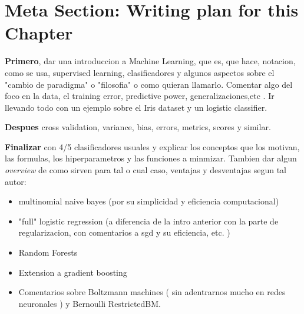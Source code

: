 \section{Meta Section: Writing plan for this Chapter}

\textbf{Primero}, dar una introduccion a Machine Learning, que es, que hace, notacion, como se usa, supervised learning, clasificadores y algunos aspectos sobre el "cambio de paradigma" o "filosofia" o como quieran llamarlo. Comentar algo del foco en la data, el training error, predictive power, generalizaciones,etc . Ir llevando todo con un ejemplo sobre el Iris dataset y un logistic classifier.

\textbf{Despues} cross validation, variance, bias, errors, metrics, scores y similar.

\textbf{Finalizar} con 4/5 clasificadores usuales y explicar los conceptos que los motivan, las formulas, los hiperparametros y las funciones a minmizar. Tambien dar algun \textit{overview} de como sirven para tal o cual caso, ventajas y desventajas segun tal autor: 
\begin{itemize}
	\item multinomial naive bayes (por su simplicidad y eficiencia computacional)
	\item "full" logistic regression (a diferencia de la intro anterior con la parte de regularizacion, con comentarios a sgd y su eficiencia, etc. )
	\item Random Forests
	\item Extension a gradient boosting
	\item Comentarios sobre Boltzmann machines ( sin adentrarnos mucho en redes neuronales ) y Bernoulli RestrictedBM.
\end{itemize}
